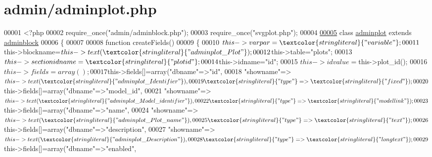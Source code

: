 \hypertarget{adminplot_8php_source}{\section{admin/adminplot.php}
}

\begin{DoxyCode}
00001 <?php
00002 require\_once(\textcolor{stringliteral}{"admin/adminblock.php"});
00003 require\_once(\textcolor{stringliteral}{"svgplot.php"});
00004 
\hypertarget{adminplot_8php_source_l00005}{}\hyperlink{classadminplot}{00005} \textcolor{keyword}{class }\hyperlink{classadminplot}{adminplot} \textcolor{keyword}{extends} \hyperlink{classadminblock}{adminblock}
00006 \{  
00007 
00008   \textcolor{keyword}{function} createFields()
00009   \{
00010     $this->varpar=\textcolor{stringliteral}{"variable"};
00011     $this->blockname=$this->text(\textcolor{stringliteral}{"adminplot\_Plot"});
00012     $this->table=\textcolor{stringliteral}{"plots"};
00013     $this->sectionidname=\textcolor{stringliteral}{"plotid"};
00014     $this->idname=\textcolor{stringliteral}{"id"};
00015     $this->idvalue=$this->plot\_id();
00016     $this->fields=array();
00017     $this->fields[]=array(\textcolor{stringliteral}{"dbname"}=>\textcolor{stringliteral}{"id"},
00018                           \textcolor{stringliteral}{"showname"}=>$this->text(\textcolor{stringliteral}{"adminplot\_Identifier"}),
00019                           \textcolor{stringliteral}{"type"}=>\textcolor{stringliteral}{"fixed"});
00020     $this->fields[]=array(\textcolor{stringliteral}{"dbname"}=>\textcolor{stringliteral}{"model\_id"},
00021                           \textcolor{stringliteral}{"showname"}=>$this->text(\textcolor{stringliteral}{"adminplot\_Model\_identifier"})
      ,
00022                           \textcolor{stringliteral}{"type"}=>\textcolor{stringliteral}{"model link"});
00023     $this->fields[]=array(\textcolor{stringliteral}{"dbname"}=>\textcolor{stringliteral}{"name"},
00024                           \textcolor{stringliteral}{"showname"}=>$this->text(\textcolor{stringliteral}{"adminplot\_Plot\_name"}),
00025                           \textcolor{stringliteral}{"type"}=>\textcolor{stringliteral}{"text"});
00026     $this->fields[]=array(\textcolor{stringliteral}{"dbname"}=>\textcolor{stringliteral}{"description"},
00027                           \textcolor{stringliteral}{"showname"}=>$this->text(\textcolor{stringliteral}{"adminplot\_Description"}),
00028                           \textcolor{stringliteral}{"type"}=>\textcolor{stringliteral}{"longtext"});
00029     $this->fields[]=array(\textcolor{stringliteral}{"dbname"}=>\textcolor{stringliteral}{"enabled"},

\end{DoxyCode}
